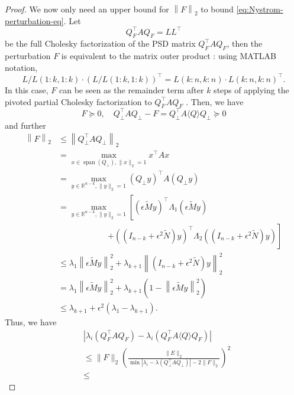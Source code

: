 \documentclass[onefignum,onetabnum]{siamart251216}
\def\realR{\mathbb{R}}
\newcommand{\image}{\operatorname{span}}
\begin{document}
\begin{proof}
We now only need an upper bound for $\left\|F\right\|_2$ to bound \eqref{eq:Nystrom-perturbation-eq}. Let 
\[
    Q_F^\top A Q_F = L L^\top
\]
be the full Cholesky factorization of the PSD matrix $Q_F^\top A Q_F$, then the perturbation $F$ is equivalent to the matrix outer product \cite{zhang2006schur}: using MATLAB notation, 
\[
    L / L(1:k, 1:k) \cdot (L / L(1:k, 1:k) )^\top = L(k:n, k:n) \cdot L(k:n, k:n)^\top.
\]
In this case, $F$ can be seen as the remainder term after $k$ steps of applying the pivoted partial Cholesky factorization to $Q_{F}^\top A Q_{F}$ \cite{chen2025randomly}. Then, we have
\[
    F \succeq 0, \quad Q_{\perp}^\top A Q_{\perp} - F = Q_{\perp}^\top A \langle Q \rangle Q_{\perp} \succeq 0
\]
and further
\[
    \begin{aligned}
        \left\|F\right\|_2
        & \leq
        \left\|Q_{\perp}^\top A Q_{\perp}\right\|_2 \\
        & =
        \max_{x \in \image(Q_{\perp}), \|x\|_2 = 1} x^\top A x \\
        & =
        \max_{y \in \realR^{n-k}, \|y\|_2 = 1} (Q_{\perp} y)^\top A (Q_{\perp} y) \\
        & = \max_{y \in \realR^{n-k}, \|y\|_2 = 1}
        \left[
        \left(\epsilon \widetilde{M} y\right)^\top \Lambda_1
        \left(\epsilon \widetilde{M} y\right) \right. \\
        & \qquad\qquad\qquad\left.
        + \left(\left(I_{n-k} + \epsilon^2 \widetilde{N}\right) y\right)^\top
        \Lambda_2
        \left(\left(I_{n-k} + \epsilon^2 \widetilde{N}\right) y\right)
        \right] \\
        & \leq \lambda_{1} \left\|\epsilon \widetilde{M} y\right\|_2^2 + \lambda_{k+1} \left\|\left(I_{n-k} + \epsilon^2 \widetilde{N}\right) y\right\|_2^2\\
        & = \lambda_{1} \left\|\epsilon \widetilde{M} y\right\|_2^2 + \lambda_{k+1}\left(1 - \left\|\epsilon \widetilde{M} y\right\|_2^2\right)\\
        & \leq \lambda_{k+1} + \epsilon^2 (\lambda_1 -\lambda_{k+1}). 
    \end{aligned}
\]
Thus, we have
\[
    \begin{aligned}
        & \left| \lambda_{i}(Q_{F}^\top A Q_{F}) - \lambda_{i}(Q_{F}^\top A \langle Q \rangle Q_{F}) \right| \\
        & \leq
        \|F\|_2 \left(\frac{\|E\|_2}{\min|\lambda_i - \lambda(Q_{\perp}^\top A Q_{\perp})| - 2 \|F\|_2}\right)^2 \\
        & \leq

\end{aligned}\]
\end{proof}
\end{document}
